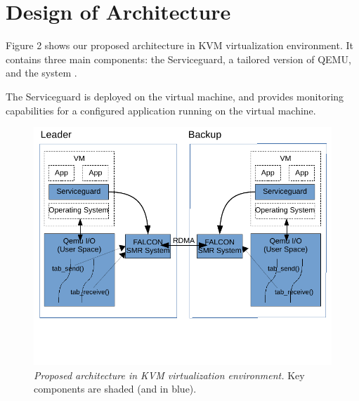 \section{Design of Architecture} \label{sec:overview}

Figure 2 shows our proposed architecture in KVM virtualization environment. 
It contains three main components: the Serviceguard, a tailored version 
of QEMU, and the \smr system \smrsystem.

The Serviceguard is deployed on the virtual machine, and provides monitoring 
capabilities for a configured application running on the virtual machine. 

\begin{figure}[t]
\centering
\includegraphics[width=.47\textwidth]{figures/arch}
\vspace{-.2in}
\caption{{\em Proposed architecture in KVM virtualization environment.} Key 
components are shaded (and in blue).} \label{fig:arc}
\vspace{.05in}
\end{figure}
